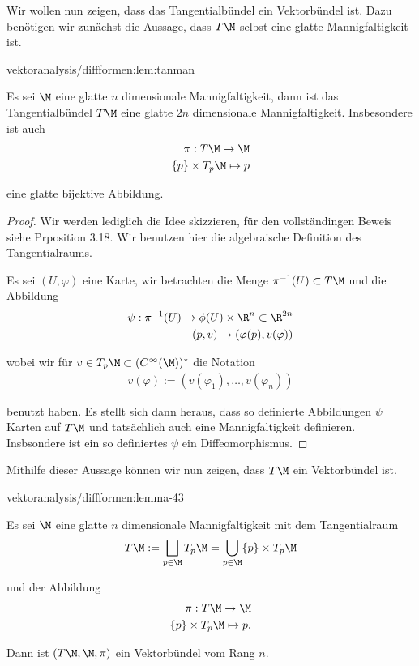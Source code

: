 \documentclass[letterpaper,10pt,english]{jupyterBook}
\begin{document}
\par
Wir wollen nun zeigen, dass das Tangentialbündel ein Vektorbündel ist. Dazu benötigen wir zunächst die Aussage, dass \(T\M\) selbst eine glatte Mannigfaltigkeit ist.
\begin{lemma}{}{vektoranalysis/diffformen:lem:tanman}



\par
Es sei \(\M\) eine glatte \(n\) dimensionale Mannigfaltigkeit, dann ist das Tangentialbündel \(T\M\) eine glatte \(2n\) dimensionale Mannigfaltigkeit. Insbesondere ist auch
\begin{align*}
\pi:T\M\to \M\\
\{p\}\times T_p\M\mapsto p
\end{align*}
\par
eine glatte bijektive Abbildung.
\end{lemma}

\begin{proof}
 Wir werden lediglich die Idee skizzieren, für den vollständingen Beweis siehe \cite{Lee03} Prposition 3.18. Wir benutzen hier die algebraische Definition des Tangentialraums.

\par
Es sei \((U,\varphi)\) eine Karte, wir betrachten die Menge \(\pi^{-1}(U)\subset T\M\) und die Abbildung
\begin{align*}
\psi:\pi^{-1}(U) \to \phi(U)\times \R^{n}\subset\R^{2n}\\
(p,v)\to (\varphi(p), v(\varphi))
\end{align*}
\par
wobei wir für \(v\in T_p\M\subset (C^\infty(\M))^\ast\) die Notation
\begin{align*}
v(\varphi) := (v(\varphi_1),\ldots, v(\varphi_n))
\end{align*}
\par
benutzt haben. Es stellt sich dann heraus, dass so definierte Abbildungen \(\psi\) Karten auf \(T\M\) und tatsächlich auch eine Mannigfaltigkeit definieren. Insbsondere ist ein so definiertes \(\psi\) ein Diffeomorphismus.
\end{proof}

\par
Mithilfe dieser Aussage können wir nun zeigen, dass \(T\M\) ein Vektorbündel ist.
\begin{lemma}{}{vektoranalysis/diffformen:lemma-43}



\par
Es sei \(\M\) eine glatte \(n\) dimensionale Mannigfaltigkeit mit dem Tangentialraum
\begin{align*}
T\M:= \bigsqcup_{p\in\M}  T_p\M = \bigcup_{p\in\M} \{p\} \times T_p\M
\end{align*}
\par
und der Abbildung
\begin{align*}
\pi:T\M\to \M\\
\{p\}\times T_p\M\mapsto p.
\end{align*}
\par
Dann ist \((T\M, \M, \pi)\) ein Vektorbündel vom Rang \(n\).
\end{lemma}
\end{document}
